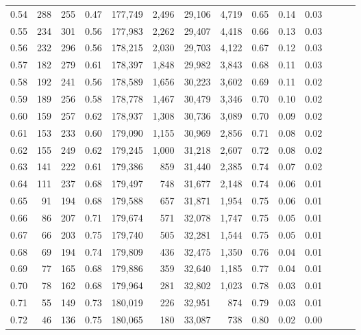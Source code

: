 \begin{tabular}{rrrrrrrrrrrrrr}
0.54 &    288 &  255 &  0.47 &  177,749 &    2,496 &  29,106 &   4,719 &  0.65 &  0.14 &      0.03 \\
0.55 &    234 &  301 &  0.56 &  177,983 &    2,262 &  29,407 &   4,418 &  0.66 &  0.13 &      0.03 \\
0.56 &    232 &  296 &  0.56 &  178,215 &    2,030 &  29,703 &   4,122 &  0.67 &  0.12 &      0.03 \\
0.57 &    182 &  279 &  0.61 &  178,397 &    1,848 &  29,982 &   3,843 &  0.68 &  0.11 &      0.03 \\
0.58 &    192 &  241 &  0.56 &  178,589 &    1,656 &  30,223 &   3,602 &  0.69 &  0.11 &      0.02 \\
0.59 &    189 &  256 &  0.58 &  178,778 &    1,467 &  30,479 &   3,346 &  0.70 &  0.10 &      0.02 \\
0.60 &    159 &  257 &  0.62 &  178,937 &    1,308 &  30,736 &   3,089 &  0.70 &  0.09 &      0.02 \\
0.61 &    153 &  233 &  0.60 &  179,090 &    1,155 &  30,969 &   2,856 &  0.71 &  0.08 &      0.02 \\
0.62 &    155 &  249 &  0.62 &  179,245 &    1,000 &  31,218 &   2,607 &  0.72 &  0.08 &      0.02 \\
0.63 &    141 &  222 &  0.61 &  179,386 &      859 &  31,440 &   2,385 &  0.74 &  0.07 &      0.02 \\
0.64 &    111 &  237 &  0.68 &  179,497 &      748 &  31,677 &   2,148 &  0.74 &  0.06 &      0.01 \\
0.65 &     91 &  194 &  0.68 &  179,588 &      657 &  31,871 &   1,954 &  0.75 &  0.06 &      0.01 \\
0.66 &     86 &  207 &  0.71 &  179,674 &      571 &  32,078 &   1,747 &  0.75 &  0.05 &      0.01 \\
0.67 &     66 &  203 &  0.75 &  179,740 &      505 &  32,281 &   1,544 &  0.75 &  0.05 &      0.01 \\
0.68 &     69 &  194 &  0.74 &  179,809 &      436 &  32,475 &   1,350 &  0.76 &  0.04 &      0.01 \\
0.69 &     77 &  165 &  0.68 &  179,886 &      359 &  32,640 &   1,185 &  0.77 &  0.04 &      0.01 \\
0.70 &     78 &  162 &  0.68 &  179,964 &      281 &  32,802 &   1,023 &  0.78 &  0.03 &      0.01 \\
0.71 &     55 &  149 &  0.73 &  180,019 &      226 &  32,951 &     874 &  0.79 &  0.03 &      0.01 \\
0.72 &     46 &  136 &  0.75 &  180,065 &      180 &  33,087 &     738 &  0.80 &  0.02 &      0.00 \\

\end{tabular}
